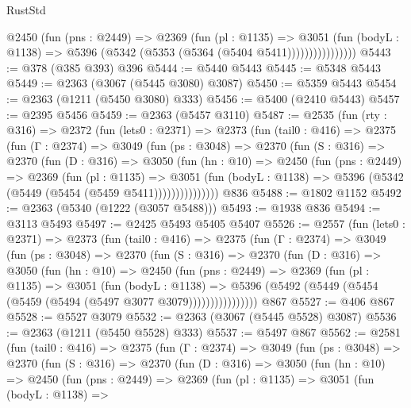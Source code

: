 \begin{lexlean}{RustStd}
\begin{coremodule}
                    @2450
                      (fun (pns : @2449) =>
                      @2369
                        (fun (pl : @1135) =>
                        @3051
                          (fun (bodyL : @1138) =>
                          @5396 (@5342 (@5353 (@5364 (@5404 @5411))))))))))))))))
@5443 := @378 (@385 @393) @396
@5444 := @5440 @5443
@5445 := @5348 @5443
@5449 := @2363 (@3067 (@5445 @3080) @3087)
@5450 := @5359 @5443
@5454 := @2363 (@1211 (@5450 @3080) @333)
@5456 := @5400 (@2410 @5443)
@5457 := @2395 @5456
@5459 := @2363 (@5457 @3110)
@5487 := @2535
    (fun (rty : @316) =>
    @2372
      (fun (lets0 : @2371) =>
      @2373
        (fun (tail0 : @416) =>
        @2375
          (fun (Γ : @2374) =>
          @3049
            (fun (ps : @3048) =>
            @2370
              (fun (S : @316) =>
              @2370
                (fun (D : @316) =>
                @3050
                  (fun (hn : @10) =>
                  @2450
                    (fun (pns : @2449) =>
                    @2369
                      (fun (pl : @1135) =>
                      @3051
                        (fun (bodyL : @1138) =>
                        @5396 (@5342 (@5449 (@5454 (@5459 @5411)))))))))))))))
    @836
@5488 := @1802 @1152
@5492 := @2363 (@5340 (@1222 (@3057 @5488)))
@5493 := @1938 @836
@5494 := @3113 @5493
@5497 := @2425 @5493 @5405 @5407
@5526 := @2557
    (fun (lets0 : @2371) =>
    @2373
      (fun (tail0 : @416) =>
      @2375
        (fun (Γ : @2374) =>
        @3049
          (fun (ps : @3048) =>
          @2370
            (fun (S : @316) =>
            @2370
              (fun (D : @316) =>
              @3050
                (fun (hn : @10) =>
                @2450
                  (fun (pns : @2449) =>
                  @2369
                    (fun (pl : @1135) =>
                    @3051
                      (fun (bodyL : @1138) =>
                      @5396 (@5492 (@5449 (@5454 (@5459 (@5494 (@5497 @3077 @3079))))))))))))))))
    @867
@5527 := @406 @867
@5528 := @5527 @3079
@5532 := @2363 (@3067 (@5445 @5528) @3087)
@5536 := @2363 (@1211 (@5450 @5528) @333)
@5537 := @5497 @867
@5562 := @2581
    (fun (tail0 : @416) =>
    @2375
      (fun (Γ : @2374) =>
      @3049
        (fun (ps : @3048) =>
        @2370
          (fun (S : @316) =>
          @2370
            (fun (D : @316) =>
            @3050
              (fun (hn : @10) =>
              @2450
                (fun (pns : @2449) =>
                @2369
                  (fun (pl : @1135) =>
                  @3051
                    (fun (bodyL : @1138) =>

\end{coremodule}
\end{lexlean}
